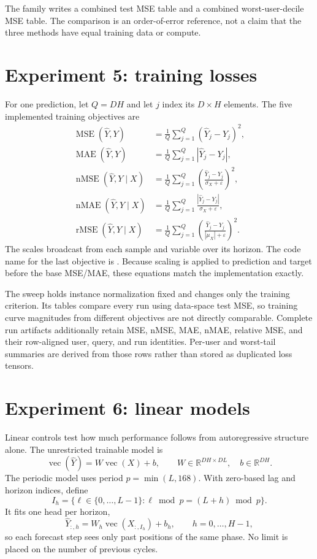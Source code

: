 \documentclass[10pt]{article}
\newcommand{\reals}{\mathbb{R}}
\newcommand{\code}[1]{\texttt{\detokenize{#1}}}
\newcommand{\MSE}{\operatorname{MSE}}
\newcommand{\MAE}{\operatorname{MAE}}
\newcommand{\nMSE}{\operatorname{nMSE}}
\newcommand{\nMAE}{\operatorname{nMAE}}
\newcommand{\rMSE}{\operatorname{rMSE}}
\begin{document}
The family writes a combined test MSE table and a combined worst-user-decile
MSE table. The comparison is an order-of-error reference, not a claim that the
three methods have equal training data or compute.

\section{Experiment 5: training losses}
\label{sec:losses}

For one prediction, let $Q=DH$ and let $j$ index its $D\times H$ elements. The
five implemented training objectives are
\begin{align}
  \MSE(\widehat Y,Y)
  &=\frac1Q\sum_{j=1}^{Q}(\widehat Y_j-Y_j)^2,\\
  \MAE(\widehat Y,Y)
  &=\frac1Q\sum_{j=1}^{Q}|\widehat Y_j-Y_j|,\\
  \nMSE(\widehat Y,Y\mid X)
  &=\frac1Q\sum_{j=1}^{Q}
    \left(\frac{\widehat Y_j-Y_j}{\sigma_X+\varepsilon}\right)^2,\\
  \nMAE(\widehat Y,Y\mid X)
  &=\frac1Q\sum_{j=1}^{Q}
    \frac{|\widehat Y_j-Y_j|}{\sigma_X+\varepsilon},\\
  \rMSE(\widehat Y,Y\mid X)
  &=\frac1Q\sum_{j=1}^{Q}
    \left(\frac{\widehat Y_j-Y_j}{|\mu_X|+\varepsilon}\right)^2.
\end{align}
The scales broadcast from each sample and variable over its horizon. The code
name for the last objective is \code{relative_mse}. Because scaling is applied
to prediction and target before the base MSE/MAE, these equations match the
implementation exactly.

The sweep holds instance normalization fixed and changes only the training
criterion. Its tables compare every run using data-space test MSE, so training
curve magnitudes from different objectives are not directly comparable.
Complete run artifacts additionally retain MSE, nMSE, MAE, nMAE, relative MSE,
and their row-aligned user, query, and run identities. Per-user and worst-tail
summaries are derived from those rows rather than stored as duplicated loss
tensors.

\section{Experiment 6: linear models}
\label{sec:linear}

Linear controls test how much performance follows from autoregressive structure
alone. The unrestricted trainable model is
\[
  \operatorname{vec}(\widehat Y)
  =W\operatorname{vec}(X)+b,
  \qquad W\in\reals^{DH\times DL},\quad b\in\reals^{DH}.
\]
The periodic model uses period $p=\min(L,168)$. With zero-based lag and horizon
indices, define
\[
  I_h=\{\ell\in\{0,\ldots,L-1\}:\ell\bmod p=(L+h)\bmod p\}.
\]
It fits one head per horizon,
\[
  \widehat Y_{:,h}=W_h\operatorname{vec}(X_{:,I_h})+b_h,
  \qquad h=0,\ldots,H-1,
\]
so each forecast step sees only past positions of the same phase. No limit is
placed on the number of previous cycles.
\end{document}
